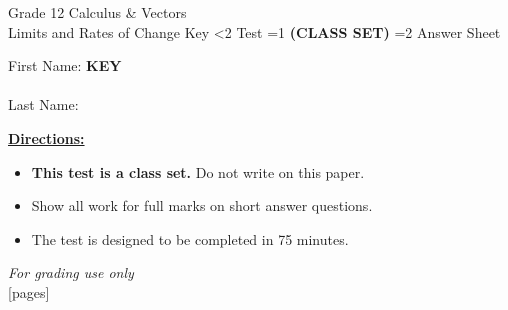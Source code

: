 \documentclass[addpoints]{exam}
\newcommand{\event}{Limits and Rates of Change}
\newcommand{\tournament}{}
\def\type{0}
\begin{document}
\begin{center}
    {\huge Grade 12 Calculus \& Vectors \\ \event
    \ifprintanswers \space Key
    \else \space \ifnum\type<2 Test \fi \ifnum\type=1 \textbf{(CLASS SET)} \fi
          \ifnum\type=2 Answer Sheet \fi
    \fi \\ \vspace{3mm}\tournament\vspace{1mm}}
\end{center}

\vspace{.25\textheight}

\begin{center}
    First Name: \ifprintanswers
    \underline{\hspace{3.5cm}}\textbf{KEY}\underline{\hspace{5.5cm}}\\\vspace{5mm}
    \else \underline{\hspace{10cm}}\\ \vspace{5mm} \fi
    Last Name: \underline{\hspace{10cm}}\\ \vspace{5mm}
\end{center}

\noindent\textbf{\underline{Directions:}}
\begin{itemize}
    \ifnum\type=1 \item \textbf{This test is a class set.} Do not write on this paper. \fi
    \item Show all work for full marks on short answer questions.
    \item The test is designed to be completed in 75 minutes.
\end{itemize}
\begin{center}
\textit{For grading use only}\\
[pages]
\end{center}
\end{document}
